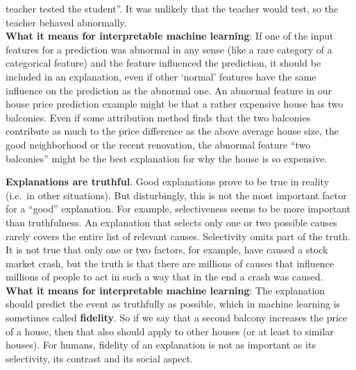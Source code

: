 \documentclass[12pt,]{krantz}
\begin{document}
teacher tested the student''. It was unlikely that the teacher would
test, so the teacher behaved abnormally.\\
\textbf{What it means for interpretable machine learning}: If one of the
input features for a prediction was abnormal in any sense (like a rare
category of a categorical feature) and the feature influenced the
prediction, it should be included in an explanation, even if other
`normal' features have the same influence on the prediction as the
abnormal one. An abnormal feature in our house price prediction example
might be that a rather expensive house has two balconies. Even if some
attribution method finds that the two balconies contribute as much to
the price difference as the above average house size, the good
neighborhood or the recent renovation, the abnormal feature ``two
balconies'' might be the best explanation for why the house is so
expensive.

\textbf{Explanations are truthful}. Good explanations prove to be true
in reality (i.e.~in other situations). But disturbingly, this is not the
most important factor for a ``good'' explanation. For example,
selectiveness seems to be more important than truthfulness. An
explanation that selects only one or two possible causes rarely covers
the entire list of relevant causes. Selectivity omits part of the truth.
It is not true that only one or two factors, for example, have caused a
stock market crash, but the truth is that there are millions of causes
that influence millions of people to act in such a way that in the end a
crash was caused.\\
\textbf{What it means for interpretable machine learning}: The
explanation should predict the event as truthfully as possible, which in
machine learning is sometimes called \textbf{fidelity}. So if we say
that a second balcony increases the price of a house, then that also
should apply to other houses (or at least to similar houses). For
humans, fidelity of an explanation is not as important as its
selectivity, its contrast and its social aspect.
\end{document}
